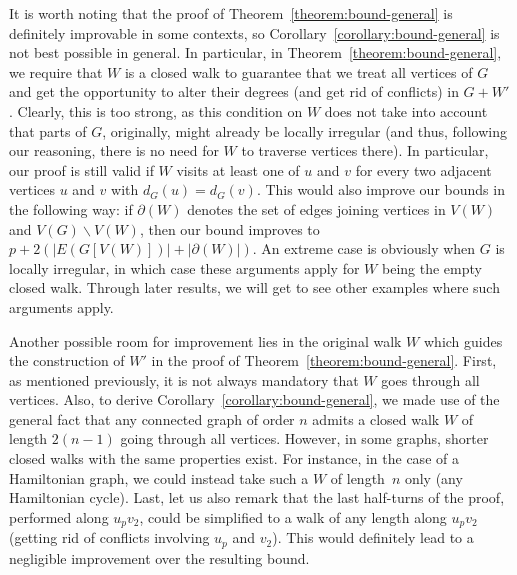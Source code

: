 \documentclass[a4paper,11pt,dvipsnames]{elsarticle}
\newcommand{\sam}[1]{\todo[size=\tiny,color=red!20!white]{\textbf{Sam:} #1}}
\newcommand{\sam}[1]{}
\begin{document}
It is worth noting that the proof of Theorem~\ref{theorem:bound-general} is definitely improvable in some contexts, so Corollary~\ref{corollary:bound-general} is not best possible in general. In particular, in Theorem~\ref{theorem:bound-general}, we require that $W$ is a closed walk to guarantee that we treat all vertices of $G$ and get the opportunity to alter their degrees (and get rid of conflicts) in $G+W'$. Clearly, this is too strong, as this condition on $W$ does not take into account that parts of $G$, originally, might already be locally irregular (and thus, following our reasoning, there is no need for $W$ to traverse vertices there). 
In particular, our proof is still valid if $W$ visits at least one of $u$ and $v$ for every two adjacent vertices $u$ and $v$ with $d_G(u)=d_G(v)$. This would also improve our bounds in the following way: if $\partial(W)$ denotes the set of edges joining vertices in $V(W)$ and $V(G)\backslash V(W)$, then our bound improves to $p+2(|E(G[V(W)])|+|\partial(W)|)$. 
An extreme case is obviously when $G$ is locally irregular, in which case these arguments apply for $W$ being the empty closed walk. Through later results, we will get to see other examples where such arguments apply.

Another possible room for improvement lies in the original walk $W$ which guides the construction of $W'$ in the proof of Theorem~\ref{theorem:bound-general}. First, as mentioned previously, it is not always mandatory that $W$ goes through all vertices. Also, to derive Corollary~\ref{corollary:bound-general}, we made use of the general fact that any connected graph of order $n$ admits a closed walk $W$ of length $2(n-1)$ going through all vertices. However, in some graphs, shorter closed walks with the same properties exist. For instance, in the case of a Hamiltonian graph, we could instead take such a $W$ of length~$n$ only (any Hamiltonian cycle).
Last, let us also remark that the last half-turns of the proof, performed along $u_pv_2$, could be simplified to a walk of any length along $u_pv_2$ (getting rid of conflicts involving $u_p$ and $v_2$). This would definitely lead to a negligible improvement over the resulting bound.
\end{document}
